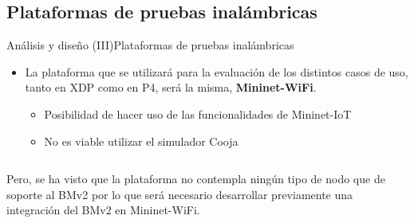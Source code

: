 \documentclass[10pt,compress,xcolor=table]{beamer} %
\newcommand{\cmark}{\ding{51}}%
\newcommand{\xmark}{\ding{55}}%
\begin{document}
\subsection{Plataformas de pruebas inalámbricas}
\begin{frame}{Análisis y diseño (III)}{Plataformas de pruebas inalámbricas}
\vspace{0.2cm}
\begin{itemize}
    \item  La plataforma que se utilizará para la evaluación de los distintos casos de uso, tanto en XDP como en P4, será la misma, \textbf{Mininet-WiFi}. \vspace{0.2cm}\begin{itemize}
        \item[] \cmark \hspace{0.1cm} Posibilidad de hacer uso de las funcionalidades de Mininet-IoT\vspace{0.1cm}
        \item[] \alert{\xmark} \hspace{0.1cm} No es viable utilizar el simulador Cooja 
    \end{itemize}
    
\end{itemize}\vspace{0.2cm}

\begin{columns}

  \begin{column}{0.9\textwidth}
    Pero, se ha visto que la plataforma \alert{no contempla} ningún tipo de nodo que de soporte \alert{al BMv2} por lo que será necesario desarrollar previamente una integración del BMv2 en Mininet-WiFi.
        
  \end{column}
  

\end{columns}
\end{frame}
\end{document}
